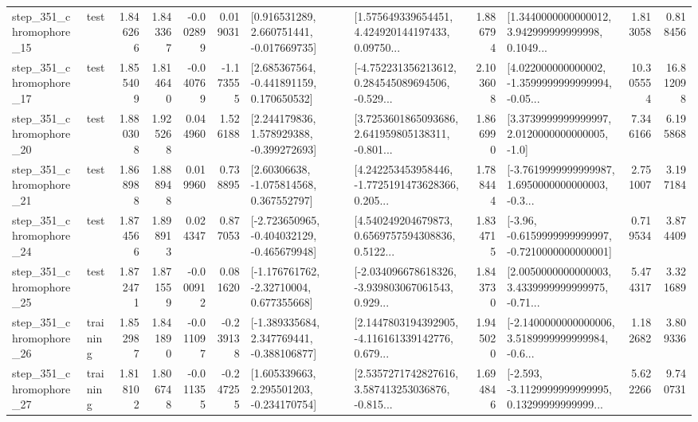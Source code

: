 \begin{tabular}{llrrrrllrlrr}
  step\_351\_chromophore\_15 &      test &      1.846266 &    1.843367 &     -0.002899 &  0.019031 &    [0.916531289, 2.660751441, -0.017669735] &  [1.575649339654451, 4.424920144197433, 0.09750... &       1.886794 &  [1.3440000000000012, 3.942999999999998, 0.1049... &            1.813058 &          0.818456 \\
  step\_351\_chromophore\_17 &      test &      1.855409 &    1.814640 &     -0.040769 & -1.173555 &    [2.685367564, -0.441891159, 0.170650532] &  [-4.752231356213612, 0.284545089694506, -0.529... &       2.103608 &  [4.022000000000002, -1.3599999999999994, -0.05... &           10.305554 &         16.812098 \\
  step\_351\_chromophore\_20 &      test &      1.880308 &    1.925268 &      0.044960 &  1.526188 &    [2.244179836, 1.578929388, -0.399272693] &  [3.7253601865093686, 2.641959805138311, -0.801... &       1.866990 &     [3.3739999999999997, 2.0120000000000005, -1.0] &            7.346166 &          6.195868 \\
  step\_351\_chromophore\_21 &      test &      1.868988 &    1.888948 &      0.019960 &  0.738895 &     [2.60306638, -1.075814568, 0.367552797] &  [4.242253453958446, -1.7725191473628366, 0.205... &       1.788444 &  [-3.7619999999999987, 1.6950000000000003, -0.3... &            2.751007 &          3.197184 \\
  step\_351\_chromophore\_24 &      test &      1.874566 &    1.898913 &      0.024347 &  0.877053 &  [-2.723650965, -0.404032129, -0.465679948] &  [4.540249204679873, 0.6569757594308836, 0.5122... &       1.834715 &  [-3.96, -0.6159999999999997, -0.7210000000000001] &            0.719534 &          3.874409 \\
  step\_351\_chromophore\_25 &      test &      1.872471 &    1.871559 &     -0.000912 &  0.081620 &    [-1.176761762, -2.32710004, 0.677355668] &  [-2.034096678618326, -3.939803067061543, 0.929... &       1.843730 &  [2.0050000000000003, 3.4339999999999975, -0.71... &            5.474317 &          3.321689 \\
  step\_351\_chromophore\_26 &  training &      1.852987 &    1.841890 &     -0.011097 & -0.239138 &   [-1.389335684, 2.347769441, -0.388106877] &  [2.1447803194392905, -4.116161339142776, 0.679... &       1.945020 &  [-2.1400000000000006, 3.5189999999999984, -0.6... &            1.182682 &          3.809336 \\
  step\_351\_chromophore\_27 &  training &      1.818102 &    1.806748 &     -0.011355 & -0.247255 &    [1.605339663, 2.295501203, -0.234170754] &  [2.5357271742827616, 3.587413253036876, -0.815... &       1.694846 &  [-2.593, -3.1129999999999995, 0.13299999999999... &            5.622266 &          9.740731 \\

\end{tabular}
